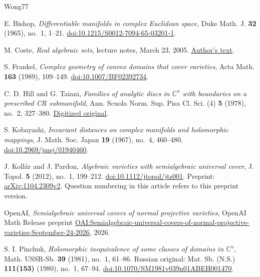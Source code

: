 \begin{thebibliography}{Wong77}

E. Bishop,
\emph{Differentiable manifolds in complex Euclidean space},
Duke Math. J. \textbf{32} (1965), no.~1, 1--21.
\href{https://doi.org/10.1215/S0012-7094-65-03201-1}
{doi:10.1215/S0012-7094-65-03201-1}.

M. Coste,
\emph{Real algebraic sets},
lecture notes, March 23, 2005.
\href{https://indico.ictp.it/event/a04204/session/10/contribution/7/material/0/0.pdf}
{Author's text}.

S. Frankel,
\emph{Complex geometry of convex domains that cover varieties},
Acta Math. \textbf{163} (1989), 109--149.
\href{https://doi.org/10.1007/BF02392734}{doi:10.1007/BF02392734}.

C. D. Hill and G. Taiani,
\emph{Families of analytic discs in $\mathbb C^n$ with boundaries on a
prescribed CR submanifold},
Ann. Scuola Norm. Sup. Pisa Cl. Sci. (4) \textbf{5} (1978), no.~2, 327--380.
\href{https://www.numdam.org/item/ASNSP_1978_4_5_2_327_0.pdf}
{Digitized original}.

S. Kobayashi,
\emph{Invariant distances on complex manifolds and holomorphic mappings},
J. Math. Soc. Japan \textbf{19} (1967), no.~4, 460--480.
\href{https://doi.org/10.2969/jmsj/01940460}{doi:10.2969/jmsj/01940460}.

J. Koll\'ar and J. Pardon,
\emph{Algebraic varieties with semialgebraic universal cover},
J. Topol. \textbf{5} (2012), no.~1, 199--212.
\href{https://doi.org/10.1112/jtopol/jts001}{doi:10.1112/jtopol/jts001}.
Preprint: \href{https://arxiv.org/abs/1104.2309v2}{arXiv:1104.2309v2}.
Question numbering in this article refers to this preprint version.

OpenAI,
\emph{Semialgebraic universal covers of normal projective varieties},
OpenAI Math Release preprint
\href{https://github.com/openai/math/blob/main/preprints/Semialgebraic-universal-covers-of-normal-projective-varieties-September-24-2026/paper.pdf}{OAI:Semialgebraic-universal-covers-of-normal-projective-varieties-September-24-2026},
2026.

S. I. Pinchuk,
\emph{Holomorphic inequivalence of some classes of domains in $\mathbb C^n$},
Math. USSR-Sb. \textbf{39} (1981), no.~1, 61--86.
Russian original: Mat. Sb. (N.S.) \textbf{111(153)} (1980), no.~1, 67--94.
\href{https://doi.org/10.1070/SM1981v039n01ABEH001470}
{doi:10.1070/SM1981v039n01ABEH001470}.


\end{thebibliography}
